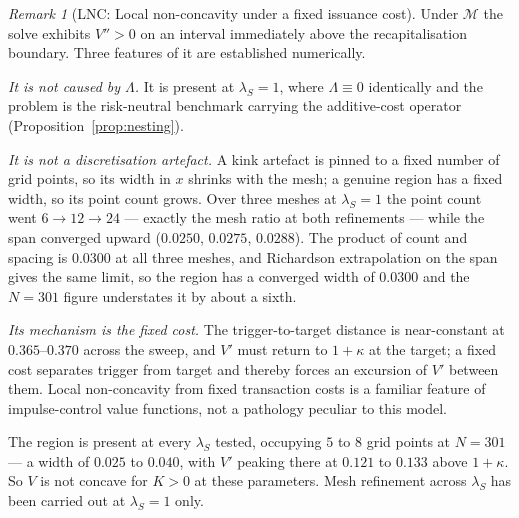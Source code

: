 \documentclass[11pt]{article}
\theoremstyle{remark}
\newtheorem{remark}{Remark}
\begin{document}
\begin{remark}[LNC: Local non-concavity under a fixed issuance cost]
\label{rem:nonconcave}
Under $\mathcal{M}$ the solve exhibits $V''>0$ on an interval immediately
above the recapitalisation boundary. Three features of it are established
numerically.

\emph{It is not caused by $\Lambda$.} It is present at $\lambda_S=1$,
where $\Lambda\equiv0$ identically and the problem is the risk-neutral
benchmark carrying the additive-cost operator
(Proposition~\ref{prop:nesting}).

\emph{It is not a discretisation artefact.} A kink artefact is pinned to a
fixed number of grid points, so its width in $x$ shrinks with the mesh; a
genuine region has a fixed width, so its point count grows. Over three
meshes at $\lambda_S=1$ the point count went $6 \to 12 \to 24$ --- exactly
the mesh ratio at both refinements --- while the span converged upward
($0.0250$, $0.0275$, $0.0288$). The product of count and spacing is
$0.0300$ at all three meshes, and Richardson extrapolation on the span
gives the same limit, so the region has a converged width of $0.0300$ and
the $N=301$ figure understates it by about a sixth.

\emph{Its mechanism is the fixed cost.} The trigger-to-target distance is
near-constant at $0.365$--$0.370$ across the sweep, and $V'$ must return
to $1+\kappa$ at the target; a fixed cost separates trigger from target
and thereby forces an excursion of $V'$ between them. Local
non-concavity from fixed transaction costs is a familiar feature of
impulse-control value functions, not a pathology peculiar to this model.

The region is present at every $\lambda_S$ tested, occupying $5$ to $8$
grid points at $N=301$ --- a width of $0.025$ to $0.040$, with $V'$
peaking there at $0.121$ to $0.133$ above $1+\kappa$. So $V$ is not
concave for $K>0$ at these parameters. Mesh refinement across $\lambda_S$
has been carried out at $\lambda_S=1$ only.
\end{remark}
\end{document}
